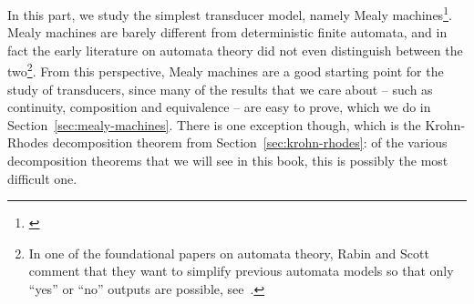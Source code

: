 In this part, we study the simplest transducer model, namely Mealy machines\footnote{\cite[Section 2.1]{mealy1955}}. Mealy machines are barely different from deterministic finite automata, and in fact the early literature on automata theory did not even distinguish between the two\footnote{In one of the foundational papers on automata theory, Rabin and Scott comment that they want to simplify previous automata models so that only ``yes'' or ``no'' outputs are possible, see~\cite[p.114]{RabinScott59}.}. From this perspective, Mealy machines are a good starting point for the study of transducers, since many of the results that we care about -- such as continuity, composition and equivalence -- are easy to prove, which we do in Section~\ref{sec:mealy-machines}. There is one exception though, which is the Krohn-Rhodes decomposition theorem from Section~\ref{sec:krohn-rhodes}: of the various decomposition theorems that we will see in this book, this is possibly the most difficult one.